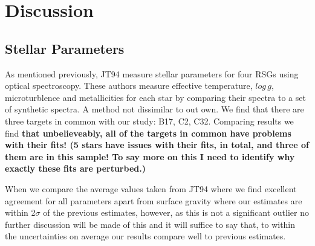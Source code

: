 \documentclass[useAMS,usenatbib]{mn2e}
\begin{document}
\section{Discussion} %
\label{sec:discussion}


\subsection{Stellar Parameters} %
\label{sub:stellar_parameters_disc}
As mentioned previously, JT94 measure stellar parameters for four RSGs using optical spectroscopy.
These authors measure effective temperature, $log\,g$, microturblence and metallicities for each star by comparing their spectra to a set of synthetic spectra.
A method not dissimilar to out own.
We find that there are three targets in common with our study: B17, C2, C32.
Comparing results we find \textbf{that unbelieveably, all of the targets in common have problems with their fits! (5 stars have issues with their fits, in total, and three of them are in this sample! To say more on this I need to identify why exactly these fits are perturbed.)}

When we compare the average values taken from JT94 where we find excellent agreement for all parameters apart from surface gravity where our estimates are within 2$\sigma$ of the previous estimates, however, as this is not a significant outlier no further discussion will be made of this and it will suffice to say that, to within the uncertainties on average our results compare well to previous estimates.

\end{document}
